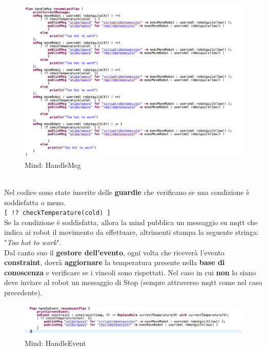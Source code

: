 \documentclass{llncs}
\begin{document}
\begin{figure}
    \centering
    \includegraphics[width=1\textwidth]{Immagini/Requisito2/HandleMsgReq2.png}
    \caption{Mind: HandleMsg}
    \label{fig:MindHandleMsg}
\end{figure}
\vspace*{1ex}
\\
Nel codice sono state inserite delle \textbf{guardie} che verificano se una condizione \`e soddisfatta o meno.\\
\texttt{[ !? checkTemperature(cold)  ]}\\
Se la condizione \`e soddisfatta, allora la mind pubblica un messaggio su mqtt che indica ai robot il movimento da effettuare, altrimenti stampa la seguente stringa: "\textit{Too hot to work}".\\
Dal canto suo il \textbf{gestore dell'evento}, ogni volta che ricever\`a l'evento \textbf{constraint}, dovr\`a \textbf{aggiornare} la temperatura presente nella \textbf{base di conoscenza} e verificare se i vincoli sono rispettati. Nel caso in cui \textbf{non} lo siano deve inviare al robot un messaggio di Stop (sempre attraverso mqtt come nel caso precedente).\\
\begin{figure}
    \centering
    \includegraphics[width=1\textwidth]{Immagini/Requisito2/handleEvtReq2.png}
    \caption{Mind: HandleEvent}
    \label{fig:MindHandleEvent}
\end{figure}
\end{document}
